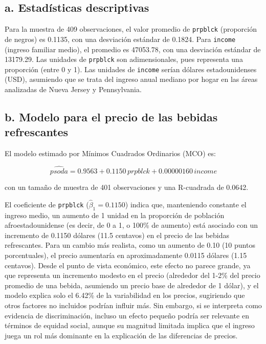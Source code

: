 \documentclass[12pt]{article}
\begin{document}
\subsection*{a. Estadísticas descriptivas}
Para la muestra de 409 observaciones, el valor promedio de \texttt{prpblck} (proporción de negros) es 0.1135, con una desviación estándar de 0.1824. Para \texttt{income} (ingreso familiar medio), el promedio es 47053.78, con una desviación estándar de 13179.29. Las unidades de \texttt{prpblck} son adimensionales, pues representa una proporción (entre 0 y 1). Las unidades de \texttt{income} serían dólares estadounidenses (USD), asumiendo que se trata del ingreso anual mediano por hogar en las áreas analizadas de Nueva Jersey y Pennsylvania.

\subsection*{b. Modelo para el precio de las bebidas refrescantes}

El modelo estimado por Mínimos Cuadrados Ordinarios (MCO) es:

\[
\widehat{psoda} = 0.9563 + 0.1150 \, prpblck + 0.00000160 \, income
\]

con un tamaño de muestra de 401 observaciones y una R-cuadrada de 0.0642.

El coeficiente de \texttt{prpblck} (\(\hat{\beta}_1 = 0.1150\)) indica que, manteniendo constante el ingreso medio, un aumento de 1 unidad en la proporción de población afroestadounidense (es decir, de 0 a 1, o 100\% de aumento) está asociado con un incremento de 0.1150 dólares (11.5 centavos) en el precio de las bebidas refrescantes. Para un cambio más realista, como un aumento de 0.10 (10 puntos porcentuales), el precio aumentaría en aproximadamente 0.0115 dólares (1.15 centavos). Desde el punto de vista económico, este efecto no parece grande, ya que representa un incremento modesto en el precio (alrededor del 1-2\% del precio promedio de una bebida, asumiendo un precio base de alrededor de 1 dólar), y el modelo explica solo el 6.42\% de la variabilidad en los precios, sugiriendo que otros factores no incluidos podrían influir más. Sin embargo, si se interpreta como evidencia de discriminación, incluso un efecto pequeño podría ser relevante en términos de equidad social, aunque su magnitud limitada implica que el ingreso juega un rol más dominante en la explicación de las diferencias de precios.
\end{document}

